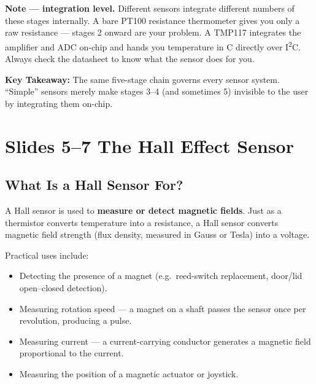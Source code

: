 \documentclass[12pt, a4paper]{article}
\begin{document}
\begin{notebox}
  \textbf{Note --- integration level.} Different sensors integrate different
  numbers of these stages internally. A bare PT100 resistance thermometer
  gives you only a raw resistance --- stages 2 onward are your problem.
  A TMP117 integrates the amplifier and ADC on-chip and hands you
  temperature in \textdegree{}C directly over I\textsuperscript{2}C.
  Always check the datasheet to know what the sensor does for you.
\end{notebox}

\begin{keybox}
  \textbf{Key Takeaway:} The same five-stage chain governs every sensor
  system. ``Simple'' sensors merely make stages 3--4 (and sometimes 5)
  invisible to the user by integrating them on-chip.
\end{keybox}

\section*{Slides 5--7 \quad The Hall Effect Sensor}

\subsection*{What Is a Hall Sensor For?}

A Hall sensor is used to \textbf{measure or detect magnetic fields}.
Just as a thermistor converts temperature into a resistance,
a Hall sensor converts magnetic field strength (flux density,
measured in Gauss or Tesla) into a voltage.

Practical uses include:
\begin{itemize}[leftmargin=1.5em]
  \item Detecting the presence of a magnet (e.g.\ reed-switch replacement,
        door/lid open--closed detection).
  \item Measuring rotation speed --- a magnet on a shaft passes the sensor
        once per revolution, producing a pulse.
  \item Measuring current --- a current-carrying conductor generates a
        magnetic field proportional to the current.
  \item Measuring the position of a magnetic actuator or joystick.
\end{itemize}
\end{document}
